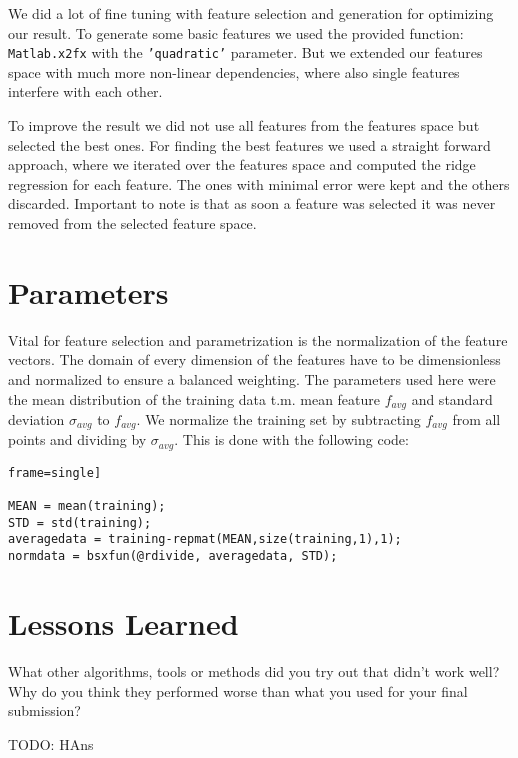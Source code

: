 \documentclass[a4paper, 11pt]{article}
\begin{document}
We did a lot of fine tuning with feature selection and generation for optimizing our result. To generate some basic features we used the provided function: \texttt{Matlab.x2fx} with the \texttt{'quadratic'} parameter. But we extended our features space with much more non-linear dependencies, where also single features interfere with each other.

To improve the result we did not use all features from the features space but selected the best ones. For finding the best features we used a straight forward approach, where we iterated over the features space and computed the ridge regression for each feature. The ones with minimal error were kept and the others discarded. Important to note is that as soon a feature was selected it was never removed from the selected feature space.


\section{Parameters}

Vital for feature selection and parametrization is the normalization of the feature vectors. The domain of every dimension of the features have to be dimensionless and normalized to ensure a balanced weighting. The parameters used here were the mean distribution of the training data t.m. mean feature $f_{avg}$ and standard deviation $\sigma_{avg}$ to $f_{avg}$. We normalize the training set by subtracting $f_{avg}$ from all points and dividing by $\sigma_{avg}$. This is done with the following code:

\begin{lstlisting}frame=single]

MEAN = mean(training);
STD = std(training);
averagedata = training-repmat(MEAN,size(training,1),1);
normdata = bsxfun(@rdivide, averagedata, STD);
\end{lstlisting}


\section{Lessons Learned} What other algorithms, tools or methods did you try out that didn't work well?
Why do you think they performed worse than what you used for your final submission?

TODO: HAns
\end{document}
